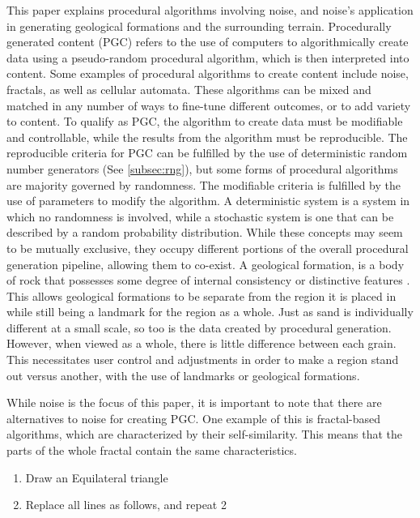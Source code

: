 \documentclass[10pt]{report}
\begin{document}
		This paper explains procedural algorithms involving noise, and noise's application in generating geological formations and the surrounding terrain. Procedurally generated content (PGC) refers to the use of computers to algorithmically create data using a pseudo-random procedural algorithm, which is then interpreted into content. Some examples of procedural algorithms to create content include noise, fractals, as well as cellular automata. These algorithms can be mixed and matched in any number of ways to fine-tune different outcomes, or to add variety to content. To qualify as PGC, the algorithm to create data must be modifiable and controllable, while the results from the algorithm must be reproducible. The reproducible criteria for PGC can be fulfilled by the use of deterministic random number generators (See \autoref{subsec:rng}), but some forms of procedural algorithms are majority governed by randomness. The modifiable criteria is fulfilled by the use of parameters to modify the algorithm. A deterministic system is a system in which no randomness is involved, while a stochastic system is one that can be described by a random probability distribution. While these concepts may seem to be mutually exclusive, they occupy different portions of the overall procedural generation pipeline, allowing them to co-exist. A geological formation, is a body of rock that possesses some degree of internal consistency or distinctive features \cite{2005}. This allows geological formations to be separate from the region it is placed in while still being a landmark for the region as a whole. Just as sand is individually different at a small scale, so too is the data created by procedural generation. However, when viewed as a whole, there is little difference between each grain. This necessitates user control and adjustments in order to make a region stand out versus another, with the use of landmarks or geological formations.
		
		While noise is the focus of this paper, it is important to note that there are alternatives to noise for creating PGC. One example of this is fractal-based algorithms, which are characterized by their self-similarity. This means that the parts of the whole fractal contain the same characteristics.
		
		\begin{enumerate}
			\item Draw an Equilateral triangle
			\item Replace all lines as follows, and repeat 2
		\end{enumerate}
		
\end{document}
